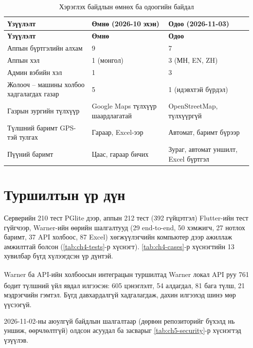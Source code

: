 \documentclass[
12pt,
oneside,
english,
onehalfspacing,
nolistspacing,
headsepline,
]{MUST-Thesis}
\newcommand{\batlah}[1]{#1\textsuperscript{\dag}}
\begin{document}
{\small
\renewcommand{\arraystretch}{1.2}
\begin{longtable}{|L{5.2cm}|L{4.2cm}|L{4.4cm}|}
\caption{Хэрэглэх байдлын өмнөх ба одоогийн байдал}\label{tab:ch5-ux}\\
\hline
{}\textbf{Үзүүлэлт} & \textbf{Өмнө (2026-10 эхэн)} & \textbf{Одоо (2026-11-03)} \\ \hline
\endfirsthead
\hline
{}\textbf{Үзүүлэлт} & \textbf{Өмнө} & \textbf{Одоо} \\ \hline
\endhead
Аппын бүртгэлийн алхам & 9 & 7 \\ \hline
Аппын хэл & 1 (монгол) & 3 (МН, EN, ZH) \\ \hline
Админ вэбийн хэл & 1 & 3 \\ \hline
Жолооч -- машины холбоо хадгалагдах газар & 5 & 1 (идэвхтэй бүрдэл) \\ \hline
Газрын зургийн түлхүүр & Google Maps түлхүүр шаардлагатай & OpenStreetMap, түлхүүргүй \\ \hline
Түлшний баримт GPS-тэй тулгах & Гараар, Excel-ээр & Автомат, баримт бүрээр \\ \hline
Пүүний баримт & Цаас, гараар бичих & Зураг, автомат уншилт, Excel бүртгэл \\ \hline
\end{longtable}
}

\section{Туршилтын үр дүн}

Серверийн 210 тест PGlite дээр, аппын 212 тест (392 гүйцэтгэл) Flutter-ийн тест гүйгчээр, Warner-ийн өөрийн шалгалтууд (29 end-to-end, 50 хэмжигч, 27 нотлох баримт, 37 API холбоос, 87 Excel) хөгжүүлэгчийн компьютер дээр ажиллаж амжилттай болсон (\ref{tab:ch4-tests}-р хүснэгт). \ref{tab:ch4-cases}-р хүснэгтийн 13 хувилбар бүгд хүлээгдсэн үр дүнтэй.

Warner ба API-ийн холбоосын интеграцын туршилтад Warner локал API руу \batlah{761} бодит түлшний үйл явдал илгээсэн: \batlah{605} цэнэглэлт, \batlah{54} алдагдал, \batlah{81} бага түлш, \batlah{21} мэдрэгчийн гэмтэл. Бүгд давхардалгүй хадгалагдаж, дахин илгээхэд шинэ мөр үүсээгүй.

2026-11-02-ны аюулгүй байдлын шалгалтаар (дөрвөн репозиторийг бүхэлд нь уншиж, өөрчлөлтгүй) олдсон асуудал ба засварыг \ref{tab:ch5-security}-р хүснэгтэд үзүүлэв.
\end{document}
